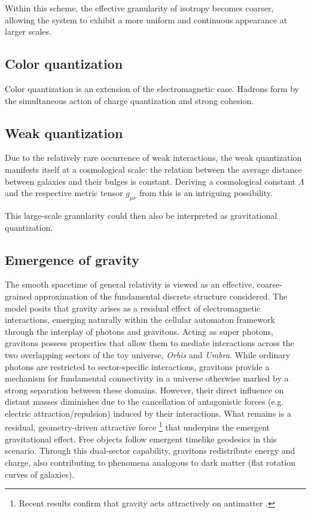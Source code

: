 \documentclass[12pt]{article}
\begin{document}
Within this scheme, the effective granularity of isotropy becomes coarser, allowing the system to exhibit a more uniform and continuous appearance at larger scales.

\subsection{Color quantization}
Color quantization is an extension of the electromagnetic case. Hadrons form by the simultaneous action of charge quantization and strong cohesion.

\subsection{Weak quantization}
Due to the relatively rare occurrence of weak interactions, the weak quantization manifests itself at a cosmological scale: the relation between the average distance between galaxies and their bulges is constant. Deriving a cosmological constant $\Lambda$ and the respective metric tensor $g_{\mu\nu}$ from this is an intriguing possibility. 

This large-scale granularity could then also be interpreted as gravitational quantization.

\subsection{Emergence of gravity}\label{subsec:emergence-of-gravity}

 The smooth spacetime of general relativity is viewed as an effective, coarse-grained approximation of the fundamental discrete structure considered. The model posits that gravity arises as a residual effect of electromagnetic interactions, emerging naturally within the cellular automaton framework through the interplay of photons and gravitons. Acting as super photons, gravitons possess properties that allow them to mediate interactions across the two overlapping sectors of the toy universe, \emph{Orbis} and \emph{Umbra}. While ordinary photons are restricted to sector-specific interactions, gravitons provide a mechanism for fundamental connectivity in a universe otherwise marked by a strong separation between these domains. However, their direct influence on distant masses diminishes due to the cancellation of antagonistic forces (e.g. electric attraction/repulsion) induced by their interactions. What remains is a residual, geometry-driven attractive force \footnote{Recent results confirm that gravity acts attractively on antimatter \cite{anderson2023observation}.} that underpins the emergent gravitational effect. Free objects follow emergent timelike geodesics in this scenario. Through this dual-sector capability, gravitons redistribute energy and charge, also contributing to phenomena analogous to dark matter (flat rotation curves of galaxies).
\end{document}
